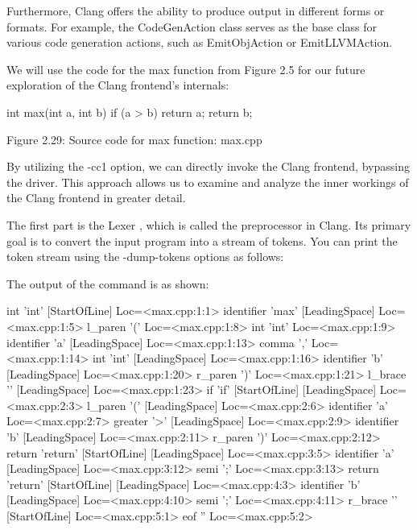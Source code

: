 Furthermore, Clang offers the ability to produce output in different forms or formats. For example, the CodeGenAction class serves as the base class for various code generation actions, such as EmitObjAction or EmitLLVMAction.

We will use the code for the max function from Figure 2.5 for our future exploration of the Clang frontend's internals:

\begin{cpp}
int max(int a, int b) {
  if (a > b)
    return a;
  return b;
}
\end{cpp}

\begin{center}
Figure 2.29: Source code for max function: max.cpp
\end{center}

By utilizing the -cc1 option, we can directly invoke the Clang frontend, bypassing the driver. This approach allows us to examine and analyze the inner workings of the Clang frontend in greater detail.


The first part is the Lexer , which is called the preprocessor in Clang. Its primary goal is to convert the input program into a stream of tokens. You can print the token stream using the -dump-tokens options as follows:


The output of the command is as shown:

\begin{shell}
int 'int'        [StartOfLine]  Loc=<max.cpp:1:1>
identifier 'max'         [LeadingSpace] Loc=<max.cpp:1:5>
l_paren '('             Loc=<max.cpp:1:8>
int 'int'               Loc=<max.cpp:1:9>
identifier 'a'   [LeadingSpace] Loc=<max.cpp:1:13>
comma ','               Loc=<max.cpp:1:14>
int 'int'        [LeadingSpace] Loc=<max.cpp:1:16>
identifier 'b'   [LeadingSpace] Loc=<max.cpp:1:20>
r_paren ')'             Loc=<max.cpp:1:21>
l_brace '{'      [LeadingSpace] Loc=<max.cpp:1:23>
if 'if'  [StartOfLine] [LeadingSpace]   Loc=<max.cpp:2:3>
l_paren '('      [LeadingSpace] Loc=<max.cpp:2:6>
identifier 'a'          Loc=<max.cpp:2:7>
greater '>'      [LeadingSpace] Loc=<max.cpp:2:9>
identifier 'b'   [LeadingSpace] Loc=<max.cpp:2:11>
r_paren ')'             Loc=<max.cpp:2:12>
return 'return'  [StartOfLine] [LeadingSpace]   Loc=<max.cpp:3:5>
identifier 'a'   [LeadingSpace] Loc=<max.cpp:3:12>
semi ';'                Loc=<max.cpp:3:13>
return 'return'  [StartOfLine] [LeadingSpace]   Loc=<max.cpp:4:3>
identifier 'b'   [LeadingSpace] Loc=<max.cpp:4:10>
semi ';'                Loc=<max.cpp:4:11>
r_brace '}'      [StartOfLine]  Loc=<max.cpp:5:1>
eof ''          Loc=<max.cpp:5:2>
\end{shell}

